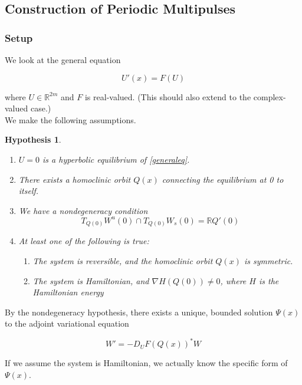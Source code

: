 \documentclass[12pt]{article}
\def\R{{\mathbb R}}
\newtheorem{hypothesis}{Hypothesis}
\begin{document}
\subsection{Construction of Periodic Multipulses}

\subsubsection{Setup}

We look at the general equation

\begin{equation}\label{generaleq}
U'(x) = F(U)
\end{equation}

where $U \in \R^{2m}$ and $F$ is real-valued. (This should also extend to the complex-valued case.)\\

We make the following assumptions.

\begin{hypothesis}\label{assumptions}
\[\]
\begin{enumerate}
	\item $U = 0$ is a hyperbolic equilibrium of \eqref{generaleq}.
	\item There exists a homoclinic orbit $Q(x)$ connecting the equilibrium at 0 to itself.
	\item We have a nondegeneracy condition
	\[
	T_{Q(0)} W^u(0) \cap T_{Q(0)} W_s(0) = \R Q'(0)
	\]
	\item At least one of the following is true:
	\begin{enumerate}
		\item The system is reversible, and the homoclinic orbit $Q(x)$ is symmetric.
		\item The system is Hamiltonian, and $\nabla H(Q(0)) \neq 0$, where $H$ is the Hamiltonian energy
	\end{enumerate}
\end{enumerate}
\end{hypothesis}

By the nondegeneracy hypothesis, there exists a unique, bounded solution $\Psi(x)$ to the adjoint variational equation

\begin{equation}
W' = -D_U F(Q(x))^* W
\end{equation}

If we assume the system is Hamiltonian, we actually know the specific form of $\Psi(x)$.

\end{document}
